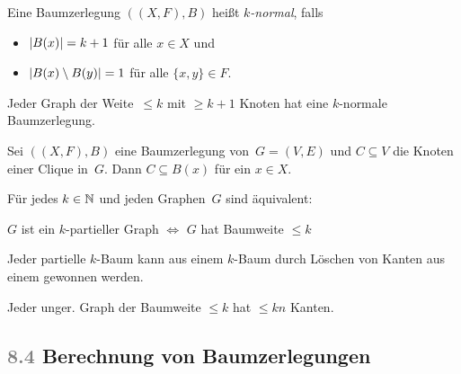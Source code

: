 \documentclass{cheat-sheet}
\newcommand{\size}[1]{\abs{#1}} %
\newcommand{\scriptSection}[1]{\textcolor{gray}{#1}\enspace}
\begin{document}

\begin{defn}
  Eine Baumzerlegung $((X, F), B)$ heißt \emph{$k$-normal}, falls
  \begin{itemize}
    \item $\size{B(x)} = k + 1$ für alle $x \in X$ und
    \item $\size{B(x) \setminus B(y)} = 1$ für alle $\{ x, y \} \in F$.
  \end{itemize}
\end{defn}

\begin{lem}
  Jeder Graph der Weite~$\leq k$ mit $\geq k + 1$ Knoten hat eine $k$-normale Baumzerlegung.
\end{lem}



\begin{lem}
  Sei $((X,F), B)$ eine Baumzerlegung von~$G = (V, E)$ und $C \subseteq V$ die Knoten einer Clique in~$G$.
  Dann $C \subseteq B(x)$ für ein $x \in X$.
\end{lem}

\begin{satz}
  Für jedes $k \in \mathbb{N}$ und jeden Graphen~$G$ sind äquivalent:
  \begin{center}
    $G$ ist ein $k$-partieller Graph $\iff$ $G$ hat Baumweite $\leq k$
  \end{center}
\end{satz}

\begin{lem}
  Jeder partielle $k$-Baum kann aus einem $k$-Baum durch Löschen von Kanten aus einem gewonnen werden.
\end{lem}

\begin{lem}
  Jeder unger. Graph der Baumweite $\leq k$ hat $\leq k n$ Kanten.
\end{lem}

\subsection{\scriptSection{8.4} Berechnung von Baumzerlegungen}
\end{document}
